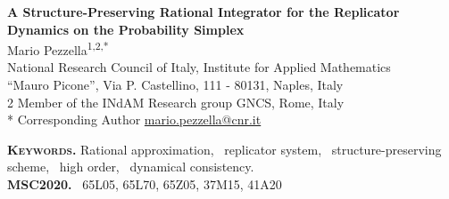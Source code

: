 \documentclass[11pt,letterpaper]{article}
\theoremstyle{remark}
\begin{document}
\vspace*{0.35in}

\begin{flushleft}
{\Large\textbf{A Structure-Preserving Rational Integrator for the Replicator Dynamics on the Probability Simplex}
}
\newline
\\
{\Large Mario Pezzella\textsuperscript{1,2,*}}
\\
 National Research Council of Italy, Institute for Applied Mathematics \\ \phantom{1} “Mauro Picone”, Via P. Castellino, 111 - 80131, Naples, Italy
\\
2 Member of the INdAM Research group GNCS, Rome, Italy
\\
* Corresponding Author \hspace{0.277 \textwidth} \faEnvelope[regular] \href{mailto:mario.pezzella@cnr.it}{mario.pezzella@cnr.it}
\end{flushleft}

\medskip

\begin{abstract}
    In this work, we introduce a quadratically convergent and dynamically consistent integrator specifically designed for the replicator dynamics. The proposed scheme combines a two-stage rational approximation with a normalization step to ensure confinement to the probability simplex and unconditional preservation of non-negativity, invariant sets and equilibria. A rigorous convergence analysis is provided to establish the scheme’s second-order accuracy, and an embedded auxiliary method is devised for adaptive time-stepping based on local error estimation. Furthermore, a discrete analogue of the quotient rule, which governs the evolution of component ratios, is shown to hold. Numerical experiments validate the theoretical results, illustrating the method’s ability to reproduce complex dynamics and to outperform well-established solvers in particularly challenging scenarios.
\end{abstract}
{ \noindent \small  \textsc{\textbf{Keywords.}} Rational approximation, \ replicator system, \ structure-preserving scheme,   \ high order, \ dynamical consistency.}\\
{ \noindent \small  \textsc{\textbf{MSC2020.}} \ 65L05, 65L70, 65Z05, 37M15, 41A20}
\end{document}
